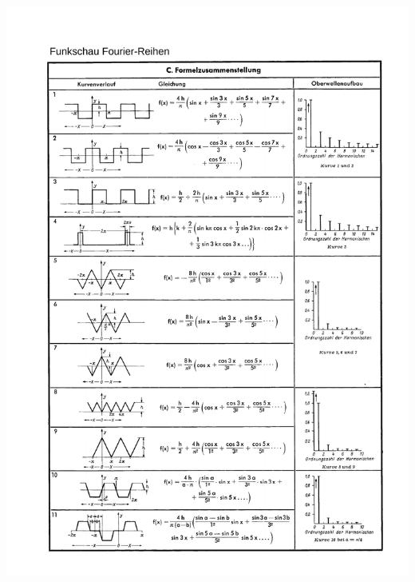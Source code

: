 \begin{center}
	\includegraphics[page=2,width=1\columnwidth]{./Bilder/FR_Tabelle_2_Funkschau}
\end{center}
